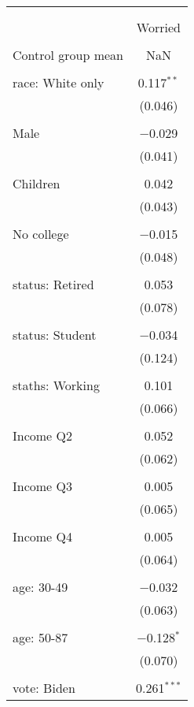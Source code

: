 
\begin{tabular}{@{\extracolsep{5pt}}lc} 
\\[-1.8ex]\hline 
\hline \\[-1.8ex] 
\\[-1.8ex] & Worried \\ 
\hline \\[-1.8ex] 
 Control group mean & NaN  \\ \hline \\[-1.8ex] race: White only & 0.117$^{**}$ \\ 
  & (0.046) \\ 
  & \\ 
 Male & $-$0.029 \\ 
  & (0.041) \\ 
  & \\ 
 Children & 0.042 \\ 
  & (0.043) \\ 
  & \\ 
 No college & $-$0.015 \\ 
  & (0.048) \\ 
  & \\ 
 status: Retired & 0.053 \\ 
  & (0.078) \\ 
  & \\ 
 status: Student & $-$0.034 \\ 
  & (0.124) \\ 
  & \\ 
 staths: Working & 0.101 \\ 
  & (0.066) \\ 
  & \\ 
 Income Q2 & 0.052 \\ 
  & (0.062) \\ 
  & \\ 
 Income Q3 & 0.005 \\ 
  & (0.065) \\ 
  & \\ 
 Income Q4 & 0.005 \\ 
  & (0.064) \\ 
  & \\ 
 age: 30-49 & $-$0.032 \\ 
  & (0.063) \\ 
  & \\ 
 age: 50-87 & $-$0.128$^{*}$ \\ 
  & (0.070) \\ 
  & \\ 
 vote: Biden & 0.261$^{***}$ \\ 

\end{tabular}
